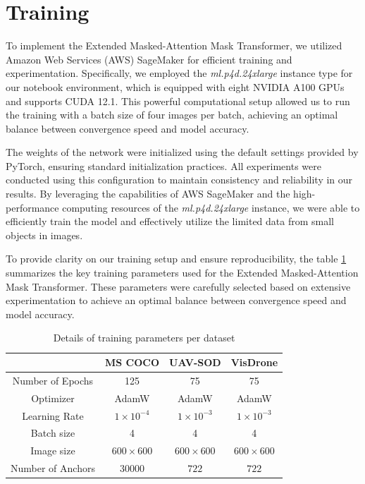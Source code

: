 \newpage
\section{Training}

To implement the Extended Masked-Attention Mask Transformer, we utilized Amazon Web Services (AWS) SageMaker for efficient training and experimentation. 
Specifically, we employed the \textit{ml.p4d.24xlarge} instance type for our notebook environment, which is equipped with eight NVIDIA A100 GPUs and supports CUDA 12.1. 
This powerful computational setup allowed us to run the training with a batch size of four images per batch, achieving an optimal balance between convergence 
speed and model accuracy.

The weights of the network were initialized using the default settings provided by PyTorch, ensuring standard initialization practices. All experiments were 
conducted using this configuration to maintain consistency and reliability in our results. By leveraging the capabilities of AWS SageMaker and the high-performance 
computing resources of the \textit{ml.p4d.24xlarge} instance, we were able to efficiently train the model and effectively utilize the limited data from small objects in images.

To provide clarity on our training setup and ensure reproducibility, the table \ref{tab:training_parameters} summarizes the key training parameters used for the 
Extended Masked-Attention Mask Transformer. These parameters were carefully selected based on extensive experimentation to achieve an optimal balance between 
convergence speed and model accuracy.
\begin{table}[h]
\centering
\begin{tabular}{|c|c|c|c|}
    \hline
    &                   \textbf{MS COCO}      & \textbf{UAV-SOD}     & \textbf{VisDrone}            \\ \hline
    Number of Epochs   & 125                  & 75                   & 75                           \\ \hline
    Optimizer          & AdamW                & AdamW                & AdamW                        \\ \hline
    Learning Rate      & $1 \times 10^{-4}$   & $1 \times 10^{-3}$   & $1 \times 10^{-3}$           \\ \hline
    Batch size         & 4                    &  4                   & 4                            \\ \hline
    Image size         & $600\times600$       &  $600\times600$      & $600\times600$               \\ \hline
    Number of Anchors  & $30000$              &  $722$               & $722$                        \\ \hline
\end{tabular}
\caption{Details of training parameters per dataset}
\label{tab:training_parameters}
\end{table}



